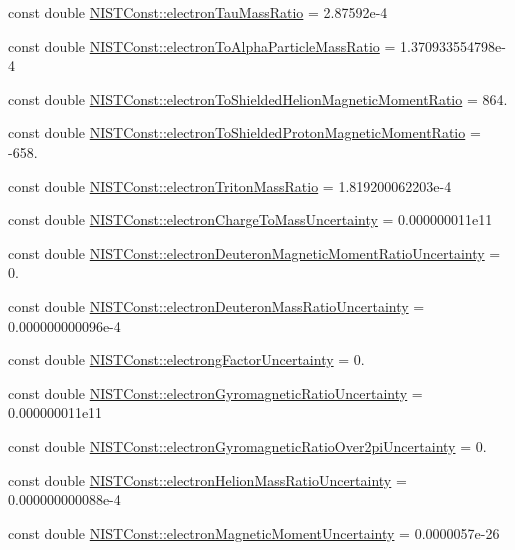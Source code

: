 \begin{DoxyCompactItemize}
\item 
const double \hyperlink{group___electron_ga513e30853388cdd091c192dfb6371fa8}{N\+I\+S\+T\+Const\+::electron\+Tau\+Mass\+Ratio} = 2.\+87592e-\/4
\item 
const double \hyperlink{group___electron_ga1090a3f764cafde391a3dfe7f459a94d}{N\+I\+S\+T\+Const\+::electron\+To\+Alpha\+Particle\+Mass\+Ratio} = 1.\+370933554798e-\/4
\item 
const double \hyperlink{group___electron_gaff98723ab3ee4e1be57a04f2a0f6034d}{N\+I\+S\+T\+Const\+::electron\+To\+Shielded\+Helion\+Magnetic\+Moment\+Ratio} = 864.
\item 
const double \hyperlink{group___electron_gacf35e7562c94178f6b182cff46131b6d}{N\+I\+S\+T\+Const\+::electron\+To\+Shielded\+Proton\+Magnetic\+Moment\+Ratio} = -\/658.
\item 
const double \hyperlink{group___electron_gac9bfee1055b6fd5d3dabb3126318b52e}{N\+I\+S\+T\+Const\+::electron\+Triton\+Mass\+Ratio} = 1.\+819200062203e-\/4
\item 
const double \hyperlink{group___electron_ga90e4e7aa66c8c40335aaafed9095e3ac}{N\+I\+S\+T\+Const\+::electron\+Charge\+To\+Mass\+Uncertainty} = 0.\+000000011e11
\item 
const double \hyperlink{group___electron_ga1d1118a17f6d7d9c134df7af6d6e934f}{N\+I\+S\+T\+Const\+::electron\+Deuteron\+Magnetic\+Moment\+Ratio\+Uncertainty} = 0.
\item 
const double \hyperlink{group___electron_gafae2e6fc55bf26f9e9d1bd6696a9bd5f}{N\+I\+S\+T\+Const\+::electron\+Deuteron\+Mass\+Ratio\+Uncertainty} = 0.\+000000000096e-\/4
\item 
const double \hyperlink{group___electron_gadc2798c29deb855a95f7f0489c9af4cc}{N\+I\+S\+T\+Const\+::electrong\+Factor\+Uncertainty} = 0.
\item 
const double \hyperlink{group___electron_gaca70ad0d6ddcb9cd3f29880a30415db8}{N\+I\+S\+T\+Const\+::electron\+Gyromagnetic\+Ratio\+Uncertainty} = 0.\+000000011e11
\item 
const double \hyperlink{group___electron_ga12a5f7854d899e2c2d637708d0c1b4ec}{N\+I\+S\+T\+Const\+::electron\+Gyromagnetic\+Ratio\+Over2pi\+Uncertainty} = 0.
\item 
const double \hyperlink{group___electron_ga38d8d37bdbda6d2c1ad4165f56901cdc}{N\+I\+S\+T\+Const\+::electron\+Helion\+Mass\+Ratio\+Uncertainty} = 0.\+000000000088e-\/4
\item 
const double \hyperlink{group___electron_ga0708e99452bf307ef0514f373323f12d}{N\+I\+S\+T\+Const\+::electron\+Magnetic\+Moment\+Uncertainty} = 0.\+0000057e-\/26

\end{DoxyCompactItemize}
